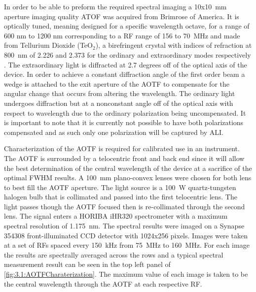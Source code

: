 \documentclass[12pt]{article}
\begin{document}
In order to be able to preform the required spectral imaging a 10x10~mm aperture imaging quality ATOF was acquired from Brimrose of America. It is optically tuned, meaning designed for a specific wavelength octave, for a range of 600 nm to 1200 nm corresponding to a RF range of 156 to 70~MHz and made from Tellurium Dioxide (TeO$_{2}$), a birefringent crystal with indices of refraction at 800~nm of 2.226 and 2.373 for the ordinary and extraordinary modes respectively \citep{Uchida1971}. The extraordinary light is diffracted at 2.7 degrees off of the optical axis of the device. In order to achieve a constant diffraction angle of the first order beam a wedge is attached to the exit aperture of the AOTF to compensate for the angular change that occurs from altering the wavelength. The ordinary light undergoes diffraction but at a nonconstant angle off of the optical axis with respect to wavelength due to the ordinary polarization being uncompensated. It is important to note that it is currently not possible to have both polarizations compensated and as such only one polarization will be captured by ALI.

Characterization of the AOTF is required for calibrated use in an instrument. The AOTF is surrounded by a telocentric front and back end since it will allow the best determination of the central wavelength of the device at a sacrifice of the optimal FWHM results. A 100~mm plano-convex lenses were chosen for both lens to best fill the AOTF aperture. The light source is a 100~W quartz-tungsten halogen bulb that is collimated and passed into the first telocentric lens. The light passes though the AOTF focused then is re-collimated through the second lens. The signal enters a HORIBA iHR320 spectrometer with a maximum spectral resolution of 1.175~nm. The spectral results were imaged on a Synapse 354308 front-illuminated CCD detector with 1024x256 pixels. Images were taken at a set of RFs spaced every 150~kHz from 75~MHz to 160~MHz. For each image the results are spectrally averaged across the rows and a typical spectral measurement result can be seen in the top left panel of \autoref{fig:3.1:AOTFCharaterization}. The maximum value of each image is taken to be the central wavelength through the AOTF at each respective RF.
\end{document}
